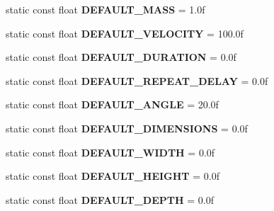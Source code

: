 \begin{DoxyCompactItemize}
\mbox{\label{classPUEmitter_af15701becf3cba416cebce55f94af01f}} 
static const float {\bfseries D\+E\+F\+A\+U\+L\+T\+\_\+\+M\+A\+SS} = 1.\+0f
\item 
\mbox{\label{classPUEmitter_a2fbe5a1a7614c6cfbd481895edf2cb04}} 
static const float {\bfseries D\+E\+F\+A\+U\+L\+T\+\_\+\+V\+E\+L\+O\+C\+I\+TY} = 100.\+0f
\item 
\mbox{\label{classPUEmitter_a5d15a1f19513f46be76d257bde84584e}} 
static const float {\bfseries D\+E\+F\+A\+U\+L\+T\+\_\+\+D\+U\+R\+A\+T\+I\+ON} = 0.\+0f
\item 
\mbox{\label{classPUEmitter_af8fe362f5ce3ffd9de7456a56f9267df}} 
static const float {\bfseries D\+E\+F\+A\+U\+L\+T\+\_\+\+R\+E\+P\+E\+A\+T\+\_\+\+D\+E\+L\+AY} = 0.\+0f
\item 
\mbox{\label{classPUEmitter_a4aaa706012e10fb7daebd11a129ac058}} 
static const float {\bfseries D\+E\+F\+A\+U\+L\+T\+\_\+\+A\+N\+G\+LE} = 20.\+0f
\item 
\mbox{\label{classPUEmitter_acb3da7e12f1220b7ff8263c147092660}} 
static const float {\bfseries D\+E\+F\+A\+U\+L\+T\+\_\+\+D\+I\+M\+E\+N\+S\+I\+O\+NS} = 0.\+0f
\item 
\mbox{\label{classPUEmitter_affd3fa45be9840246179a46178bc4356}} 
static const float {\bfseries D\+E\+F\+A\+U\+L\+T\+\_\+\+W\+I\+D\+TH} = 0.\+0f
\item 
\mbox{\label{classPUEmitter_aaa55062539e297f491b56426fd963994}} 
static const float {\bfseries D\+E\+F\+A\+U\+L\+T\+\_\+\+H\+E\+I\+G\+HT} = 0.\+0f
\item 
\mbox{\label{classPUEmitter_a92ea2688d0ec5c5888650eea66799281}} 
static const float {\bfseries D\+E\+F\+A\+U\+L\+T\+\_\+\+D\+E\+P\+TH} = 0.\+0f
\end{DoxyCompactItemize}
